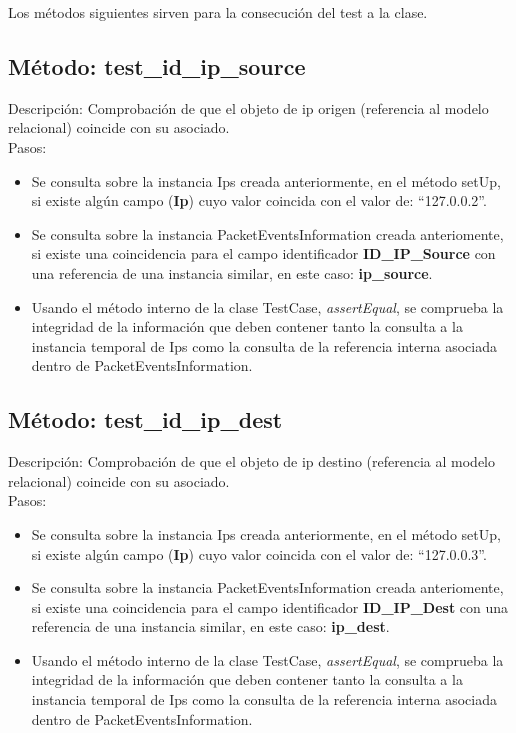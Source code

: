 Los métodos siguientes sirven para la consecución del test a la clase. \\

\subsection{Método: test\_id\_ip\_source}
Descripción: Comprobación de que el objeto de ip origen (referencia al modelo relacional) coincide con su asociado.\\
Pasos:
\begin{itemize}
\item Se consulta sobre la instancia Ips creada anteriormente, en el método setUp, si existe algún campo (\textbf{Ip}) cuyo valor coincida con el valor de: ``127.0.0.2''.
\item Se consulta sobre la instancia PacketEventsInformation creada anteriomente, si existe una coincidencia para el campo identificador \textbf{ID\_IP\_Source} con una referencia de una instancia similar, en este caso: \textbf{ip\_source}.
\item Usando el método interno de la clase TestCase, \emph{assertEqual}, se comprueba la integridad de la información que deben contener tanto la consulta a la instancia temporal de Ips como la consulta de la referencia interna asociada dentro de PacketEventsInformation.
\end{itemize}



\subsection{Método: test\_id\_ip\_dest}

Descripción: Comprobación de que el objeto de ip destino (referencia al modelo relacional) coincide con su asociado.\\
Pasos:
\begin{itemize}
\item Se consulta sobre la instancia Ips creada anteriormente, en el método setUp, si existe algún campo (\textbf{Ip}) cuyo valor coincida con el valor de: ``127.0.0.3''.
\item Se consulta sobre la instancia PacketEventsInformation creada anteriomente, si existe una coincidencia para el campo identificador \textbf{ID\_IP\_Dest} con una referencia de una instancia similar, en este caso: \textbf{ip\_dest}.
\item Usando el método interno de la clase TestCase, \emph{assertEqual}, se comprueba la integridad de la información que deben contener tanto la consulta a la instancia temporal de Ips como la consulta de la referencia interna asociada dentro de PacketEventsInformation.
\end{itemize}

